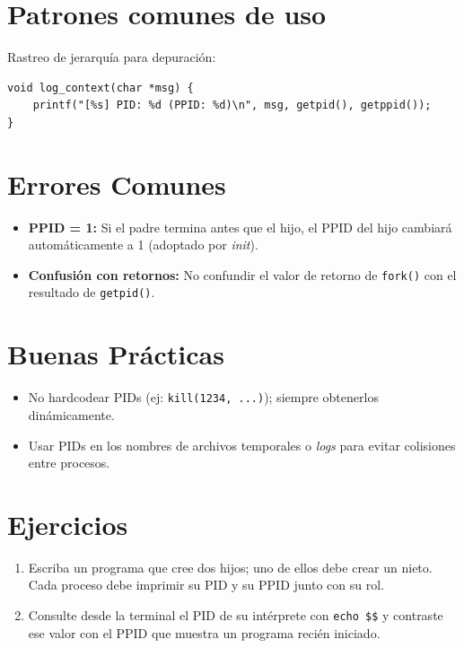 \documentclass[12pt,a4paper]{article}
\begin{document}
\section{Patrones comunes de uso}
Rastreo de jerarquía para depuración:
\begin{lstlisting}
void log_context(char *msg) {
    printf("[%s] PID: %d (PPID: %d)\n", msg, getpid(), getppid());
}
\end{lstlisting}

\section{Errores Comunes}
\begin{itemize}
    \item \textbf{PPID = 1:} Si el padre termina antes que el hijo, el PPID del hijo cambiará automáticamente a 1 (adoptado por \textit{init}).
    \item \textbf{Confusión con retornos:} No confundir el valor de retorno de \texttt{fork()} con el resultado de \texttt{getpid()}.
\end{itemize}

\section{Buenas Prácticas}
\begin{itemize}
    \item No hardcodear PIDs (ej: \texttt{kill(1234, ...)}); siempre obtenerlos dinámicamente.
    \item Usar PIDs en los nombres de archivos temporales o \textit{logs} para evitar colisiones entre procesos.
\end{itemize}

\section{Ejercicios}
\begin{enumerate}
    \item Escriba un programa que cree dos hijos; uno de ellos debe crear un nieto. Cada proceso debe imprimir su PID y su PPID junto con su rol.
    \item Consulte desde la terminal el PID de su intérprete con \texttt{echo \$\$} y contraste ese valor con el PPID que muestra un programa recién iniciado.
\end{enumerate}
\end{document}
